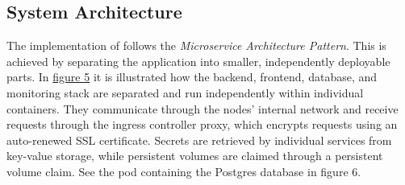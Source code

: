\subsection{System Architecture}
\label{subsec:system_architecture}
The implementation of \mini follows the \textit{Microservice Architecture Pattern}. This is achieved by separating the application into smaller, independently deployable parts. In \hyperref[fig:figdeployworker]{figure 5} it is illustrated how the backend, frontend, database, and monitoring stack are separated and run independently within individual containers. 
They communicate through the nodes' internal network and receive requests through the ingress controller proxy, which encrypts requests using an auto-renewed SSL certificate. 
Secrets are retrieved by individual services from key-value storage, while persistent volumes are claimed through a persistent volume claim. 
See the pod containing the Postgres database in figure 6.

